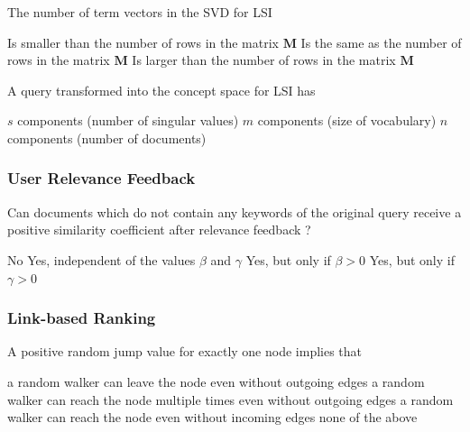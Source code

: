 \documentclass[12pt,a4paper,answers]{exam} %
\newcommand{\mat}[1]{\ensuremath{\textbf{#1}}}
\begin{document}
\begin{flushleft}
\begin{multicols*}{2}
\begin{questions}
\question The number of term vectors in the SVD for LSI
\begin{checkboxes}
\choice Is smaller than the number of rows in the matrix \mat{M}
\CorrectChoice Is the same as the number of rows in the matrix \mat{M}
\choice Is larger than the number of rows in the matrix \mat{M}
\end{checkboxes}

\question A query transformed into the concept space for LSI has
\begin{checkboxes}
\CorrectChoice $s$ components (number of singular values)
\choice $m$ components (size of vocabulary)
\choice $n$ components (number of documents)
\end{checkboxes}


\subsubsection{User Relevance Feedback}

\question Can documents which do not contain any keywords of the original query receive a positive similarity coefficient after relevance feedback ?
\begin{checkboxes}
\choice No
\choice Yes, independent of the values $\beta$ and $\gamma$
\CorrectChoice Yes, but only if $\beta>0$
\choice Yes, but only if $\gamma>0$
\end{checkboxes}


\subsubsection{Link-based Ranking}

\question A positive random jump value for exactly one node implies that
\begin{checkboxes}
\CorrectChoice a random walker can leave the node even without outgoing edges
\choice a random walker can reach the node multiple times even without outgoing edges
\CorrectChoice a random walker can reach the node even without incoming edges
\choice none of the above
\end{checkboxes}


\end{questions}
\end{multicols*}
\end{flushleft}
\end{document}
